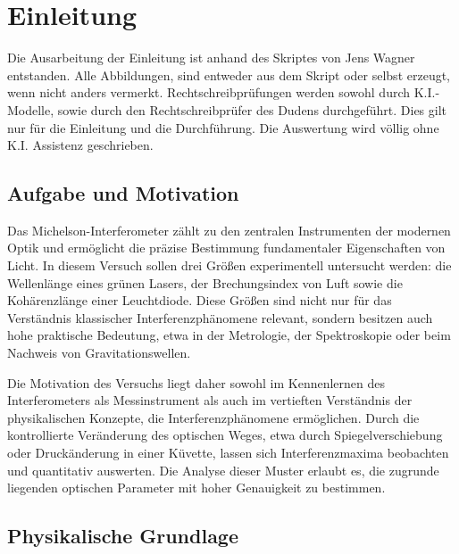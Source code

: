 \chapter{Einleitung} \label{ch:Einleitung}

Die Ausarbeitung der Einleitung ist anhand des Skriptes von Jens Wagner entstanden. Alle Abbildungen, sind entweder aus dem Skript oder selbst erzeugt, wenn nicht anders vermerkt. Rechtschreibprüfungen werden sowohl durch K.I.-Modelle, sowie durch den Rechtschreibprüfer des Dudens durchgeführt.  Dies gilt nur für die Einleitung und die Durchführung. Die Auswertung wird völlig ohne K.I. Assistenz geschrieben. \cite{skriptPAP21, Duden}


\section{Aufgabe und Motivation} \label{sec:AuM}

Das Michelson-Interferometer zählt zu den zentralen Instrumenten der modernen Optik und ermöglicht die präzise Bestimmung fundamentaler Eigenschaften von Licht. In diesem Versuch sollen drei Größen experimentell untersucht werden: die Wellenlänge eines grünen Lasers, der Brechungsindex von Luft sowie die Kohärenzlänge einer Leuchtdiode. Diese Größen sind nicht nur für das Verständnis klassischer Interferenzphänomene relevant, sondern besitzen auch hohe praktische Bedeutung, etwa in der Metrologie, der Spektroskopie oder beim Nachweis von Gravitationswellen.  

Die Motivation des Versuchs liegt daher sowohl im Kennenlernen des Interferometers als Messinstrument als auch im vertieften Verständnis der physikalischen Konzepte, die Interferenzphänomene ermöglichen. Durch die kontrollierte Veränderung des optischen Weges, etwa durch Spiegelverschiebung oder Druckänderung in einer Küvette, lassen sich Interferenzmaxima beobachten und quantitativ auswerten. Die Analyse dieser Muster erlaubt es, die zugrunde liegenden optischen Parameter mit hoher Genauigkeit zu bestimmen.


\section{Physikalische Grundlage} \label{sec:PhyBasics}

